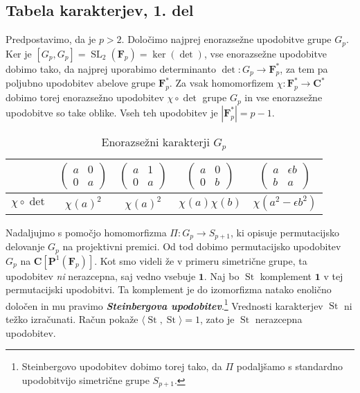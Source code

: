 \documentclass[11pt]{book}
\def\CC{\mathbf{C}}
\def\11{\mathbf{1}}
\def\FF{\mathbf{F}}
\def\PP{\mathbf{P}}
\DeclareMathOperator\St{St}
\DeclareMathOperator\SL{SL}
\def\definicija{\color{rdeca}\bf\em}
\theoremstyle{definition}
\theoremstyle{zgled}
\theoremstyle{odprtproblem}
\theoremstyle{domacanaloga}
\theoremstyle{izrek}
\begin{document}
\subsection{Tabela karakterjev, 1. del}

Predpostavimo, da je $p > 2$. Določimo najprej enorazsežne upodobitve grupe $G_p$. Ker je $[G_p, G_p] = \SL_2(\FF_p) = \ker (\det)$, vse enorazsežne upodobitve dobimo tako, da najprej uporabimo determinanto $\det \colon G_p \to \FF_p^*$, za tem pa poljubno upodobitev abelove grupe $\FF_p^*$. Za vsak homomorfizem $\chi \colon \FF_p^* \to \CC^*$ dobimo torej enorazsežno upodobitev $\chi \circ \det$ grupe $G_p$ in vse enorazsežne upodobitve so take oblike. Vseh teh upodobitev je $|\FF_p^*| = p-1$.

\begin{table}[ht]
    \centering
\begin{tabular}{l|*{4}{c}}
    & 
    $\begin{pmatrix}
        a & 0 \\ 0 & a
    \end{pmatrix}$
    &
    $\begin{pmatrix}
        a & 1 \\ 0 & a
    \end{pmatrix}$
    &
    $\begin{pmatrix}
        a & 0 \\ 0 & b
    \end{pmatrix}$
    &
    $\begin{pmatrix}
        a & \epsilon b \\ b & a
    \end{pmatrix}$ \\ \hline
    $\chi \circ \det$ & $\chi(a)^2$ & $\chi(a)^2$ & $\chi(a) \chi(b)$ & $\chi(a^2 - \epsilon b^2)$ \\
\end{tabular}
\caption{Enorazsežni karakterji $G_p$}
\end{table}

Nadaljujmo s pomočjo homomorfizma $\Pi \colon G_p \to S_{p+1}$, ki opisuje permutacijsko delovanje $G_p$ na projektivni premici. Od tod dobimo permutacijsko upodobitev $G_p$ na $\CC[\PP^1(\FF_p)]$. Kot smo videli že v primeru simetrične grupe, ta upodobitev \emph{ni} nerazcepna, saj vedno vsebuje $\11$. Naj bo $\St$ komplement $\11$ v tej permutacijski upodobitvi. Ta komplement je do izomorfizma natako enolično določen in mu pravimo {\definicija Steinbergova upodobitev}.\footnote{Steinbergovo upodobitev dobimo torej tako, da $\Pi$ podaljšamo s standardno upodobitvijo simetrične grupe $S_{p+1}$.} Vrednosti karakterjev $\St$ ni težko izračunati. Račun pokaže $\langle \St, \St \rangle = 1$, zato je $\St$ nerazcepna upodobitev.
\end{document}
